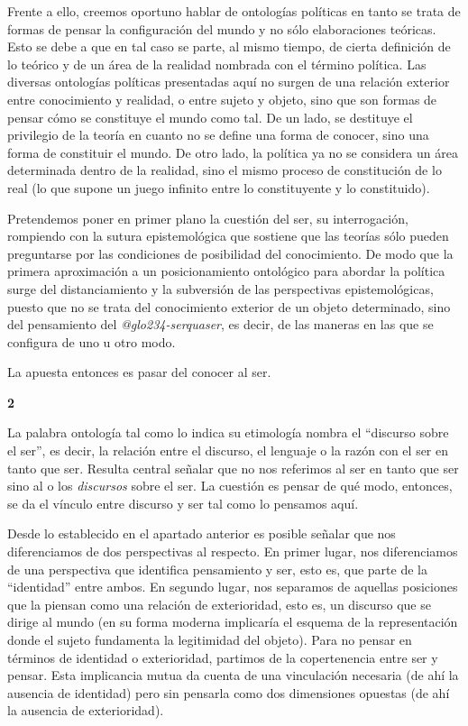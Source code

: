 Frente a ello, creemos oportuno hablar de ontologías políticas en tanto se trata de formas de pensar la configuración del mundo y no sólo elaboraciones teóricas. Esto se debe a que en tal caso se parte, al mismo tiempo, de cierta definición de lo teórico y de un área de la realidad nombrada con el término política. Las diversas ontologías políticas presentadas aquí no surgen de una relación exterior entre conocimiento y realidad, o entre sujeto y objeto, sino que son formas de pensar cómo se constituye el mundo como tal. De un lado, se destituye el privilegio de la teoría en cuanto no se define una forma de conocer, sino una forma de constituir el mundo. De otro lado, la política ya no se considera un área determinada dentro de la realidad, sino el mismo proceso de constitución de lo real (lo que supone un juego infinito entre lo constituyente y lo constituido).

Pretendemos poner en primer plano la cuestión del ser, su interrogación, rompiendo con la sutura epistemológica que sostiene que las teorías sólo pueden preguntarse por las condiciones de posibilidad del conocimiento. De modo que la primera aproximación a un posicionamiento ontológico para abordar la política surge del distanciamiento y la subversión de las perspectivas epistemológicas, puesto que no se trata del conocimiento exterior de un objeto determinado, sino del pensamiento del \emph{\gls{@glo234-serquaser}}, es decir, de las maneras en las que se configura de uno u otro modo.

La apuesta entonces es pasar del conocer al ser.

\vspace{1em}
\noindent\textbf{2}


La palabra ontología tal como lo indica su etimología nombra el \enquote{discurso sobre el ser}, es decir, la relación entre el discurso, el lenguaje o la razón con el ser en tanto que ser. Resulta central señalar que no nos referimos al ser en tanto que ser  sino al o los \emph{discursos} sobre el ser. La cuestión es pensar de qué modo, entonces, se da el vínculo entre discurso y ser tal como lo pensamos aquí.

Desde lo establecido en el apartado anterior es posible señalar que nos diferenciamos de dos perspectivas al respecto. En primer lugar, nos diferenciamos de una perspectiva que identifica pensamiento y ser, esto es, que parte de la \enquote{identidad} entre ambos. En segundo lugar, nos separamos de aquellas posiciones que la piensan como una relación de exterioridad, esto es, un discurso que se dirige al mundo (en su forma moderna implicaría el esquema de la representación donde el sujeto fundamenta la legitimidad del objeto). Para no pensar en términos de identidad o exterioridad, partimos de la copertenencia entre ser y pensar. Esta implicancia mutua da cuenta de una vinculación necesaria (de ahí la ausencia de identidad) pero sin pensarla como dos dimensiones opuestas (de ahí la ausencia de exterioridad).

